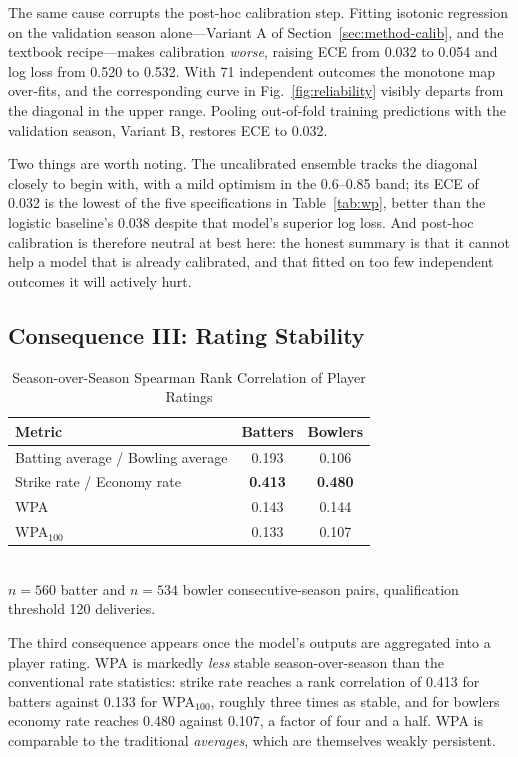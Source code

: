 \documentclass[conference]{IEEEtran}
\begin{document}
The same cause corrupts the post-hoc calibration step. Fitting isotonic
regression on the validation season alone---Variant A of
Section~\ref{sec:method-calib}, and the textbook recipe---makes
calibration \emph{worse}, raising ECE from 0.032 to 0.054 and log loss
from 0.520 to 0.532. With 71 independent outcomes the monotone map
over-fits, and the corresponding curve in Fig.~\ref{fig:reliability}
visibly departs from the diagonal in the upper range. Pooling out-of-fold
training predictions with the validation season, Variant B, restores ECE
to 0.032.

Two things are worth noting. The uncalibrated ensemble tracks the
diagonal closely to begin with, with a mild optimism in the 0.6--0.85
band; its ECE of 0.032 is the lowest of the five specifications in
Table~\ref{tab:wp}, better than the logistic baseline's 0.038 despite
that model's superior log loss. And post-hoc calibration is therefore
neutral at best here: the honest summary is that it cannot help a model
that is already calibrated, and that fitted on too few independent
outcomes it will actively hurt.

\subsection{Consequence III: Rating Stability}
\label{sec:res-stability}

\begin{table}[htbp]
\caption{Season-over-Season Spearman Rank Correlation of Player Ratings}
\label{tab:stability}
\centering
\begin{tabular}{lcc}
\toprule
\textbf{Metric} & \textbf{Batters} & \textbf{Bowlers} \\
\midrule
Batting average / Bowling average & 0.193 & 0.106 \\
Strike rate / Economy rate & \textbf{0.413} & \textbf{0.480} \\
WPA & 0.143 & 0.144 \\
WPA$_{100}$ & 0.133 & 0.107 \\
\bottomrule
\end{tabular}
\\[2pt]\footnotesize $n=560$ batter and $n=534$ bowler consecutive-season
pairs, qualification threshold 120 deliveries.
\end{table}

The third consequence appears once the model's outputs are aggregated
into a player rating. WPA is markedly \emph{less} stable
season-over-season than the conventional rate statistics: strike rate
reaches a rank correlation of 0.413 for batters against 0.133 for
WPA$_{100}$, roughly three times as stable, and for bowlers economy rate
reaches 0.480 against 0.107, a factor of four and a half. WPA is
comparable to the traditional \emph{averages}, which are themselves
weakly persistent.
\end{document}
